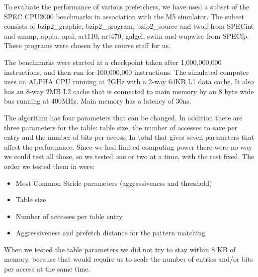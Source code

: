 To evaluate the performance of various prefetchers, we have used
a subset of the SPEC CPU2000 benchmarks in association with the M5
simulator. The subset consists of bzip2\_graphic, bzip2\_program, bzip2\_source and twolf from
SPECint and ammp, applu, apsi, art110, art470, galgel, swim and wupwise from SPECfp.
These programs were chosen by the course staff for us.

The benchmarks were started at a checkpoint taken after
1,000,000,000 instructions, and then run for 100,000,000 instructions.
The simulated computer uses an ALPHA CPU running at 2GHz
with a 2-way 64KB L1 data cache. It also has an 8-way 2MB L2 cache that is
connected to main memory by an 8 byte wide bus running at
400MHz. Main memory has a latency of 30ns.

The algorithm has four parameters that can be changed. In addition there are
three parameters for the table: table size, the number of accesses to save per
entry and the number of bits per access. In total that gives seven parameters
that affect the performance. Since we had limited computing power there were no way we
could test all those, so we tested one or two at a time, with the rest fixed.
The order we tested them in were:

\begin{itemize}
	\item Most Common Stride parameters (aggressiveness and threshold)
	\item Table size
	\item Number of accesses per table entry
	\item Aggressiveness and prefetch distance for the pattern matching
\end{itemize}

When we tested the table parameters we did not try to stay within 8 KB of
memory, because that would require us to scale the number of entries and/or
bits per access at the same time.

